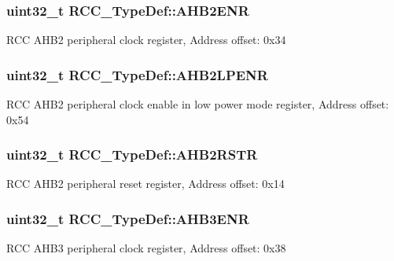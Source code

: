 \subsubsection[{\texorpdfstring{A\+H\+B2\+E\+NR}{AHB2ENR}}]{ uint32\+\_\+t R\+C\+C\+\_\+\+Type\+Def\+::\+A\+H\+B2\+E\+NR}\hypertarget{struct_r_c_c___type_def_af326cb98c318fc08894a8dd79c2c675f}{}\label{struct_r_c_c___type_def_af326cb98c318fc08894a8dd79c2c675f}
R\+CC A\+H\+B2 peripheral clock register, Address offset\+: 0x34 
\subsubsection[{\texorpdfstring{A\+H\+B2\+L\+P\+E\+NR}{AHB2LPENR}}]{ uint32\+\_\+t R\+C\+C\+\_\+\+Type\+Def\+::\+A\+H\+B2\+L\+P\+E\+NR}\hypertarget{struct_r_c_c___type_def_a1de344446cba3f4dd15c56fbe20eb0dd}{}\label{struct_r_c_c___type_def_a1de344446cba3f4dd15c56fbe20eb0dd}
R\+CC A\+H\+B2 peripheral clock enable in low power mode register, Address offset\+: 0x54 
\subsubsection[{\texorpdfstring{A\+H\+B2\+R\+S\+TR}{AHB2RSTR}}]{ uint32\+\_\+t R\+C\+C\+\_\+\+Type\+Def\+::\+A\+H\+B2\+R\+S\+TR}\hypertarget{struct_r_c_c___type_def_a343e0230ded55920ff2a04fbde0e5bcd}{}\label{struct_r_c_c___type_def_a343e0230ded55920ff2a04fbde0e5bcd}
R\+CC A\+H\+B2 peripheral reset register, Address offset\+: 0x14 
\subsubsection[{\texorpdfstring{A\+H\+B3\+E\+NR}{AHB3ENR}}]{ uint32\+\_\+t R\+C\+C\+\_\+\+Type\+Def\+::\+A\+H\+B3\+E\+NR}\hypertarget{struct_r_c_c___type_def_ad4ea7be562b42e2ae1a84db44121195d}{}\label{struct_r_c_c___type_def_ad4ea7be562b42e2ae1a84db44121195d}
R\+CC A\+H\+B3 peripheral clock register, Address offset\+: 0x38 
